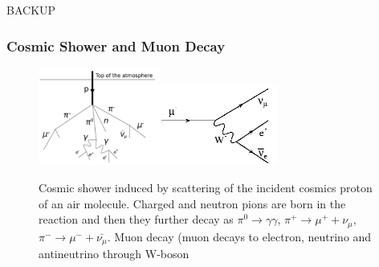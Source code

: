 \begin{frame}
\huge
\begin{center}
BACKUP
\end{center}
\end{frame}

\begin{frame}\frametitle{Cosmic Shower and Muon Decay}
\begin{figure}
\caption{Cosmic shower induced by scattering of the incident cosmics proton of an air molecule. Charged and neutron pions are born in the reaction and then they further decay as $\pi^0 \rightarrow \gamma\gamma$, $\pi^+ \rightarrow \mu^+ + \nu_\mu$, $\pi^- \rightarrow \mu^- + \bar{\nu_\mu}$. Muon decay \cite{ref_fig_MuonDecay}(muon decays to electron, neutrino and antineutrino through W-boson}
\label{fig:cosmicMuons}
\centering
\includegraphics[width=0.35\textwidth, keepaspectratio=true]{figs/cosmicMuons.png}\includegraphics[width=0.35\textwidth, keepaspectratio=true]{figs/MuonDecay.png}
\end{figure}
\end{frame}

